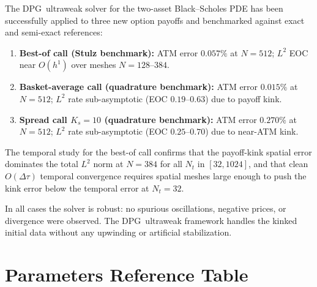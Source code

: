 \documentclass[11pt,a4paper]{article}
\newcommand{\dpg}{\textsc{DPG}}
\newcommand{\Ks}{K_s}
\begin{document}
The \dpg\ ultraweak solver for the two-asset Black–Scholes PDE has been
successfully applied to three new option payoffs and benchmarked against exact
and semi-exact references:

\begin{enumerate}
  \item \textbf{Best-of call (Stulz benchmark):} ATM error $0.057\%$ at $N=512$;
        $L^2$ EOC near $O(h^1)$ over meshes $N=128$--$384$.
  \item \textbf{Basket-average call (quadrature benchmark):} ATM error $0.015\%$
        at $N=512$; $L^2$ rate sub-asymptotic (EOC $0.19$--$0.63$) due to payoff kink.
  \item \textbf{Spread call $\Ks=10$ (quadrature benchmark):} ATM error $0.270\%$
        at $N=512$; $L^2$ rate sub-asymptotic (EOC $0.25$--$0.70$) due to near-ATM kink.
\end{enumerate}

The temporal study for the best-of call confirms that the payoff-kink spatial
error dominates the total $L^2$ norm at $N=384$ for all $N_t$ in $[32,1024]$,
and that clean $O(\Delta\tau)$ temporal convergence requires spatial meshes
large enough to push the kink error below the temporal error at $N_t=32$.

In all cases the solver is robust: no spurious oscillations, negative prices,
or divergence were observed.  The \dpg\ ultraweak framework handles the kinked
initial data without any upwinding or artificial stabilization.

\appendix

\section{Parameters Reference Table}
\label{app:params}
\end{document}
